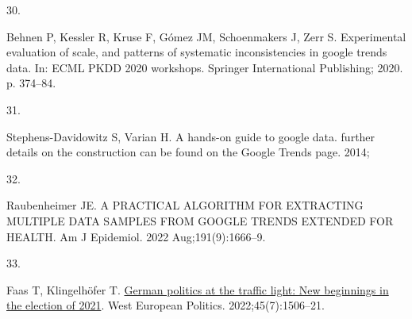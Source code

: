 \documentclass[
  letterpaper,
  DIV=11,
  numbers=noendperiod]{scrartcl}
\newlength{\cslhangindent}
\newlength{\csllabelwidth}
\newlength{\cslentryspacingunit} %
\newenvironment{CSLReferences}[2] %
 {%
  \setlength{\parindent}{0pt}
  \ifodd #1
  \let\oldpar\par
  \def\par{\hangindent=\cslhangindent\oldpar}
  \fi
  \setlength{\parskip}{#2\cslentryspacingunit}
 }%
 {}
\newcommand{\CSLLeftMargin}[1]{\parbox[t]{\csllabelwidth}{#1}}
\newcommand{\CSLRightInline}[1]{\parbox[t]{\linewidth - \csllabelwidth}{#1}\break}
\begin{document}
\begin{CSLReferences}{0}{0}
\leavevmode{}%
\CSLLeftMargin{30. }%
\CSLRightInline{Behnen P, Kessler R, Kruse F, Gómez JM, Schoenmakers J,
Zerr S. Experimental evaluation of scale, and patterns of systematic
inconsistencies in google trends data. In: {ECML} {PKDD} 2020 workshops.
Springer International Publishing; 2020. p. 374--84. }

\leavevmode{}%
\CSLLeftMargin{31. }%
\CSLRightInline{Stephens-Davidowitz S, Varian H. A hands-on guide to
google data. further details on the construction can be found on the
Google Trends page. 2014; }

\leavevmode{}%
\CSLLeftMargin{32. }%
\CSLRightInline{Raubenheimer JE. A {PRACTICAL} {ALGORITHM} {FOR}
{EXTRACTING} {MULTIPLE} {DATA} {SAMPLES} {FROM} {GOOGLE} {TRENDS}
{EXTENDED} {FOR} {HEALTH}. Am J Epidemiol. 2022 Aug;191(9):1666--9. }

\leavevmode{}%
\CSLLeftMargin{33. }%
\CSLRightInline{Faas T, Klingelhöfer T.
\href{https://doi.org/10.1080/01402382.2022.2045783}{German politics at
the traffic light: New beginnings in the election of 2021}. West
European Politics. 2022;45(7):1506--21. }

\end{CSLReferences}
\end{document}
